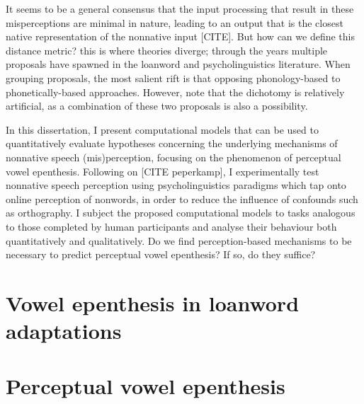 {\color{red}
It seems to be a general consensus %
that the input %
processing that result in these misperceptions are minimal in nature, leading to an output that is the closest native representation of the nonnative input [CITE]. But how can we define this distance metric? this is where theories diverge; through the years multiple proposals have spawned in the loanword and psycholinguistics literature. When grouping proposals, the most salient rift is that opposing phonology-based to phonetically-based approaches. %
However, note that the dichotomy is relatively artificial, as a combination of these two proposals is also a possibility. %

In this dissertation, I present computational models that can be used to quantitatively evaluate hypotheses concerning the underlying mechanisms of nonnative speech (mis)perception, focusing on the phenomenon of perceptual vowel epenthesis. Following on [CITE peperkamp], I experimentally test nonnative speech perception using psycholinguistics paradigms which tap onto online %
perception of nonwords, in order to reduce the influence of confounds such as orthography. %
I subject the proposed computational models to tasks analogous to those completed by human participants and analyse their behaviour both quantitatively and qualitatively. Do we find perception-based mechanisms to be necessary to predict perceptual vowel epenthesis? If so, do they suffice? 
}

\section{Vowel epenthesis in loanword adaptations}
\section{Perceptual vowel epenthesis}
